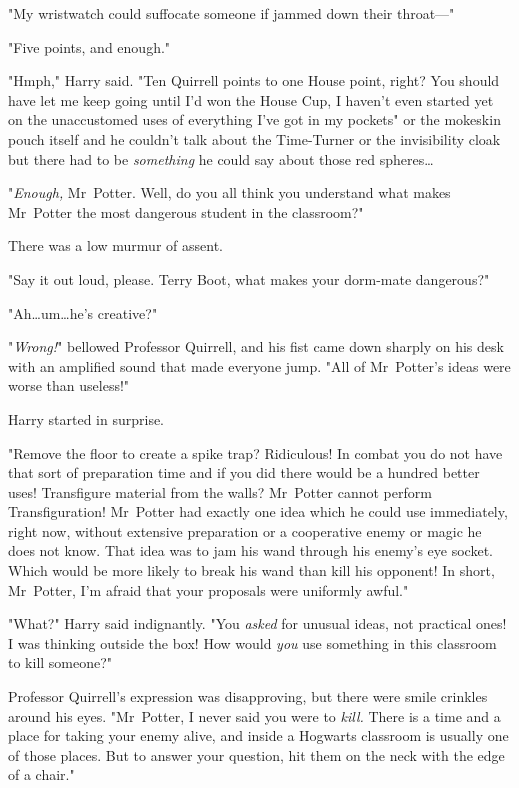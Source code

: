"My wristwatch could suffocate someone if jammed down their throat—"

"Five points, and enough."

"Hmph," Harry said. "Ten Quirrell points to one House point, right? You should
have let me keep going until I’d won the House Cup, I haven’t even started yet
on the unaccustomed uses of everything I’ve got in my pockets" or the mokeskin
pouch itself and he couldn’t talk about the Time-Turner or the invisibility
cloak but there had to be \emph{something} he could say about those red
spheres…

"\emph{Enough,} Mr~Potter. Well, do you all think you understand what makes
Mr~Potter the most dangerous student in the classroom?"

There was a low murmur of assent.

"Say it out loud, please. Terry Boot, what makes your dorm-mate dangerous?"

"Ah…um…he’s creative?"

"\emph{Wrong!}" bellowed Professor Quirrell, and his fist came down sharply on
his desk with an amplified sound that made everyone jump. "All of Mr~Potter’s
ideas were worse than useless!"

Harry started in surprise.

"Remove the floor to create a spike trap? Ridiculous! In combat you do not have
that sort of preparation time and if you did there would be a hundred better
uses! Transfigure material from the walls? Mr~Potter cannot perform
Transfiguration! Mr~Potter had exactly one idea which he could use
immediately, right now, without extensive preparation or a cooperative enemy or
magic he does not know. That idea was to jam his wand through his enemy’s eye
socket. Which would be more likely to break his wand than kill his opponent! In
short, Mr~Potter, I’m afraid that your proposals were uniformly awful."

"What?" Harry said indignantly. "You \emph{asked} for unusual ideas, not
practical ones! I was thinking outside the box! How would \emph{you} use
something in this classroom to kill someone?"

Professor Quirrell’s expression was disapproving, but there were smile crinkles
around his eyes. "Mr~Potter, I never said you were to \emph{kill.} There is a
time and a place for taking your enemy alive, and inside a Hogwarts classroom
is usually one of those places. But to answer your question, hit them on the
neck with the edge of a chair."

